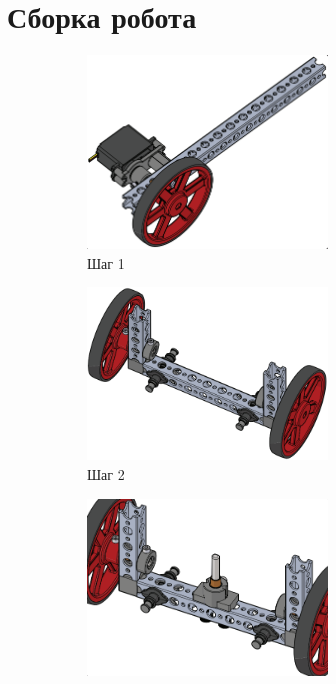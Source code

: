 \section{Сборка робота}
\begin{figure}[h]
    \begin{subfigure}[b]{0.45\textwidth}
        \centering
        \includegraphics[width=0.7\textwidth]{fig/assembly/4.1.png}
        \caption*{Шаг 1}
    \end{subfigure}
    \begin{subfigure}[b]{0.45\textwidth}
        \centering
        \includegraphics[width=0.7\textwidth]{fig/assembly/4.2.png}
        \caption*{Шаг 2}
    \end{subfigure}
    \begin{subfigure}[b]{0.45\textwidth}
        \centering
        \includegraphics[width=0.7\textwidth]{fig/assembly/4.3.png}

\end{subfigure}
\end{figure}
